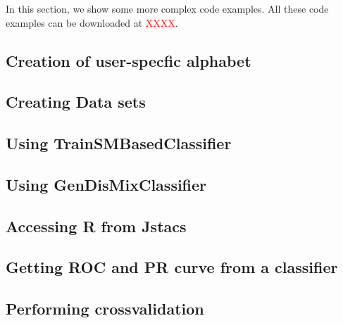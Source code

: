 In this section, we show some more complex code examples. All these code examples can be downloaded at \textcolor{red}{XXXX}.

\subsection{Creation of user-specfic alphabet}
\renewcommand{\codefile}{./recipes/AlphabetCreation.java}
\setcounter{off}{33}

\subsection{Creating Data sets}
\renewcommand{\codefile}{./recipes/DataLoader.java}
\setcounter{off}{42}

\subsection{Using TrainSMBasedClassifier}
\renewcommand{\codefile}{./recipes/TrainSMBasedClassifierTest.java}
\setcounter{off}{53}

\subsection{Using GenDisMixClassifier}
\renewcommand{\codefile}{./recipes/GenDisMixClassifierTest.java}
\setcounter{off}{54}

\subsection{Accessing R from Jstacs}
\renewcommand{\codefile}{./recipes/RserveTest.java}
\setcounter{off}{40}

\subsection{Getting ROC and PR curve from a classifier}
\renewcommand{\codefile}{./recipes/CurvePlotter.java}
\setcounter{off}{53}

\subsection{Performing crossvalidation}
\renewcommand{\codefile}{./recipes/Crossvalidation.java}
\setcounter{off}{62}
